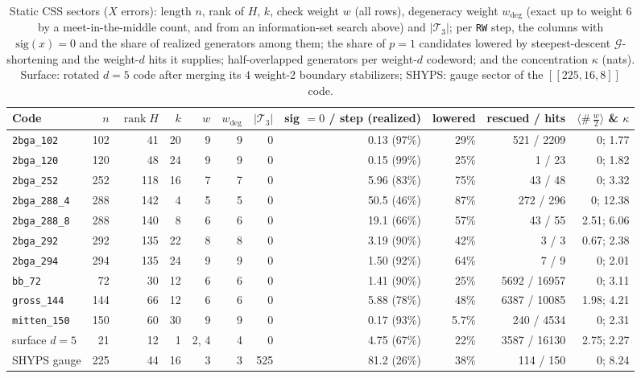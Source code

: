 \documentclass[12pt]{article}
\theoremstyle{definition}
\DeclareMathOperator{\rank}{rank}
\newcommand{\Tc}{\mathcal{T}_3}
\newcommand{\Gc}{\mathcal{G}}
\newcommand{\ttt}[1]{\texttt{#1}}
\begin{document}
\begin{table}[htbp]
\centering
\caption{Static CSS sectors ($X$ errors): length $n$, rank of $H$, $k$, check weight $w$ (all rows), degeneracy weight
$w_{\deg}$ (exact up to weight $6$ by a meet-in-the-middle count, and from an information-set search above) and
$|\Tc|$; per \ttt{RW} step, the columns with $\mathrm{sig}(x) = 0$ and the share of realized generators among them;
the share of $p = 1$ candidates lowered by steepest-descent $\Gc$-shortening and the weight-$d$ hits it supplies;
half-overlapped generators per weight-$d$ codeword; and the concentration $\kappa$ (nats). Surface: rotated $d = 5$
code after merging its $4$ weight-2 boundary stabilizers; SHYPS: gauge sector of the $[[225, 16, 8]]$
code.}\label{tab:static_css}
\smallskip
\scriptsize
\setlength{\tabcolsep}{3.0pt}
\begin{tabular}{@{}lrrrrrrrrrr@{}}
\toprule
Code & $n$ & $\rank H$ & $k$ & $w$ & $w_{\deg}$ & $|\Tc|$ & sig $= 0$ / step (realized) & lowered & rescued / hits &
  $\langle\#\,\tfrac{w}{2}\rangle$ \& $\kappa$ \\
\midrule
\ttt{2bga\_102} & 102 & 41 & 20 & 9 & 9 & 0 & 0.13 (97\%) & 29\% & 521 / 2209 & 0; 1.77 \\
\ttt{2bga\_120} & 120 & 48 & 24 & 9 & 9 & 0 & 0.15 (99\%) & 25\% & 1 / 23 & 0; 1.82 \\
\ttt{2bga\_252} & 252 & 118 & 16 & 7 & 7 & 0 & 5.96 (83\%) & 75\% & 43 / 48 & 0; 3.32 \\
\ttt{2bga\_288\_4} & 288 & 142 & 4 & 5 & 5 & 0 & 50.5 (46\%) & 87\% & 272 / 296 & 0; 12.38 \\
\ttt{2bga\_288\_8} & 288 & 140 & 8 & 6 & 6 & 0 & 19.1 (66\%) & 57\% & 43 / 55 & 2.51; 6.06 \\
\ttt{2bga\_292} & 292 & 135 & 22 & 8 & 8 & 0 & 3.19 (90\%) & 42\% & 3 / 3 & 0.67; 2.38 \\
\ttt{2bga\_294} & 294 & 135 & 24 & 9 & 9 & 0 & 1.50 (92\%) & 64\% & 7 / 9 & 0; 2.01 \\
\ttt{bb\_72} & 72 & 30 & 12 & 6 & 6 & 0 & 1.41 (90\%) & 25\% & 5692 / 16957 & 0; 3.11 \\
\ttt{gross\_144} & 144 & 66 & 12 & 6 & 6 & 0 & 5.88 (78\%) & 48\% & 6387 / 10085 & 1.98; 4.21 \\
\ttt{mitten\_150} & 150 & 60 & 30 & 9 & 9 & 0 & 0.17 (93\%) & 5.7\% & 240 / 4534 & 0; 2.31 \\
surface $d = 5$ & 21 & 12 & 1 & 2, 4 & 4 & 0 & 4.75 (67\%) & 22\% & 3587 / 16130 & 2.75; 2.27 \\
SHYPS gauge & 225 & 44 & 16 & 3 & 3 & 525 & 81.2 (26\%) & 38\% & 114 / 150 & 0; 8.24 \\
\bottomrule
\end{tabular}
\end{table}
\end{document}

